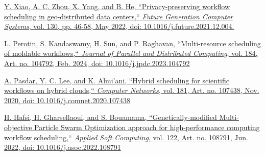 \documentclass[a4paper, final]{article}
\begin{document}
\begin{thebibliography}{0}
	\href{https://doi.org/10.1016/j.future.2021.12.004}{
    Y. Xiao, A. C. Zhou, X. Yang, and B. He,
    ``Privacy-preserving workflow scheduling in geo-distributed data centers,``
    \textit{Future Generation Computer Systems}, vol. 130, pp. 46-58, May 2022,
    doi: 10.1016/j.future.2021.12.004.
    }

	\href{https://doi.org/10.1016/j.jpdc.2023.104792}{
    L. Perotin, S. Kandaswamy, H. Sun, and P. Raghavan,
    ``Multi-resource scheduling of moldable workflows,``  
    \textit{Journal of Parallel and Distributed Computing}, vol. 184, Art. no. 104792, Feb. 2024,
    doi: 10.1016/j.jpdc.2023.104792
    }

	\href{https://doi.org/10.1016/j.comnet.2020.107438}{
    A. Pasdar, Y. C. Lee, and K. Almi’ani,
    ``Hybrid scheduling for scientific workflows on hybrid clouds,``
    \textit{Computer Networks}, vol. 181, Art. no. 107438, Nov. 2020,
    doi: 10.1016/j.comnet.2020.107438
    }

	\href{https://doi.org/10.1016/j.asoc.2022.108791}{
    H. Hafsi, H. Gharsellaoui, and S. Bouamama,
    ``Genetically-modified Multi-objective Particle Swarm Optimization approach for high-performance 
    computing workflow scheduling,``
    \textit{Applied Soft Computing}, vol. 122, Art. no. 108791, Jun. 2022,
    doi: 10.1016/j.asoc.2022.108791
    }
\end{thebibliography}


\newpage
\end{document}
